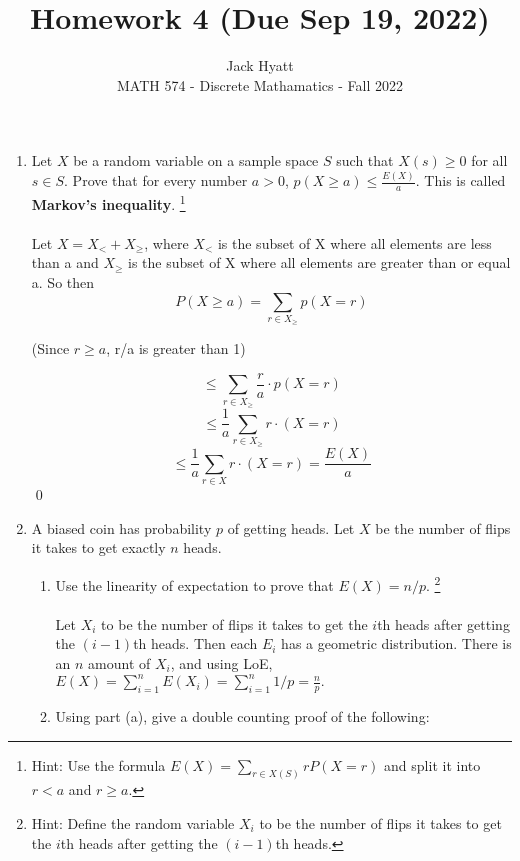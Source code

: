 \documentclass[12pt]{article}
\begin{document}
	
	\title{Homework 4 (Due Sep 19, 2022)}%
	\author{Jack Hyatt\\ %
		MATH 574 - Discrete Mathamatics - Fall 2022} %
	
	\maketitle
	
	\noindent
	
	\medskip 

\begin{enumerate}
\item Let $X$ be a random variable on a sample space $S$ such that $X(s) \geq 0$ for all $s \in S$. Prove that for every number $a>0$, $p(X \geq a) \leq \frac{E(X)}{a}$. This is called {\bf Markov's inequality}. \footnote{Hint: Use the formula $E(X) = \sum_{r \in X(S)} r P(X=r)$ and split it into $r <a$ and $r \geq a$.}\\\\
Let $X = X_< + X_\geq$, where $X_<$ is the subset of X where all elements are less than a and $X_\geq$ is the subset of X where all elements are greater than or equal a. So then \[P(X \geq a) = \sum_{r \in X_\geq}p(X=r)\] \begin{center}(Since $r\geq a$, r/a is greater than 1)\end{center}
\[\leq  \sum_{r \in X_\geq} \frac{r}{a}\cdot p(X=r)\] 
\[\leq \frac{1}{a}\sum_{r \in X_\geq}r\cdotp(X=r)\]
\[\leq \frac{1}{a}\sum_{r \in X}r\cdotp(X=r) = \frac{E(X)}{a}\]\qed

\item A biased coin has probability $p$ of getting heads. Let $X$ be the number of flips it takes to get exactly $n$ heads.

\begin{enumerate}
\item Use the linearity of expectation to prove that $E(X) = n/p$. \qquad \footnote{Hint: Define the random variable $X_i$ to be the number of flips it takes to get the $i$th heads after getting the $(i-1)$th heads.}\\\\
Let $X_i$ to be the number of flips it takes to get the $i$th heads after getting the $(i-1)$th heads. Then each $E_i$ has a geometric distribution. There is an $n$ amount of $X_i$, and using LoE, $E(X)=\sum_{i=1}^{n}E(X_i)=\sum_{i=1}^{n}1/p = \frac{n}{p}.$
\item Using part (a), give a double counting proof of the following:


\end{enumerate}
\end{enumerate}
\end{document}
